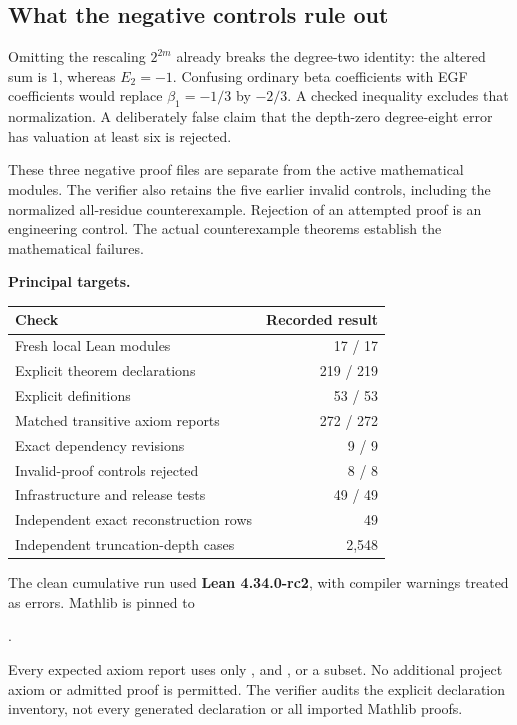 \subsection*{What the negative controls rule out}
Omitting the rescaling $2^{2m}$ already breaks the degree-two identity: the altered sum is $1$, whereas $E_2=-1$. Confusing ordinary beta coefficients with EGF coefficients would replace $\beta_1=-1/3$ by $-2/3$. A checked inequality excludes that normalization. A deliberately false claim that the depth-zero degree-eight error has valuation at least six is rejected.

These three negative proof files are separate from the active mathematical modules. The verifier also retains the five earlier invalid controls, including the normalized all-residue counterexample. Rejection of an attempted proof is an engineering control. The actual counterexample theorems establish the mathematical failures.

\textbf{Principal targets.}\par
{}\par
{}\par
{}
\par\medskip
{}
\begin{center}
\begin{tabular}{@{}p{}r@{}}
\toprule
Check & Recorded result\\\midrule
Fresh local Lean modules & 17 / 17\\
Explicit theorem declarations & 219 / 219\\
Explicit definitions & 53 / 53\\
Matched transitive axiom reports & 272 / 272\\
Exact dependency revisions & 9 / 9\\
Invalid-proof controls rejected & 8 / 8\\
Infrastructure and release tests & 49 / 49\\
Independent exact reconstruction rows & 49\\
Independent truncation-depth cases & 2,548\\\bottomrule
\end{tabular}
\end{center}
The clean cumulative run used \textbf{Lean 4.34.0-rc2}, with compiler warnings treated as errors. Mathlib is pinned to
\begin{center}
.
\end{center}
Every expected axiom report uses only ,  and , or a subset. No additional project axiom or admitted proof is permitted. The verifier audits the explicit declaration inventory, not every generated declaration or all imported Mathlib proofs.

